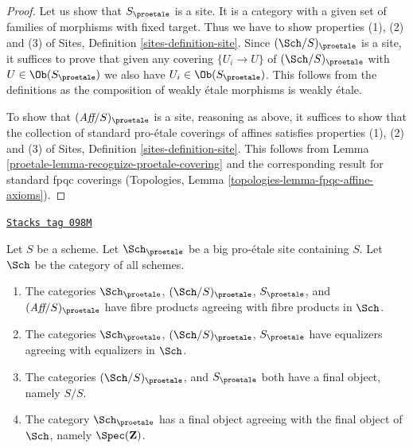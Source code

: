 \begin{proof}

Let us show that $S_\proetale$ is a site. It is a category with a
given set of families of morphisms with fixed target. Thus we
have to show properties (1), (2) and (3) of
Sites, Definition \ref{sites-definition-site}.
Since $(\Sch/S)_\proetale$ is a site, it suffices to prove
that given any covering $\{U_i \to U\}$ of $(\Sch/S)_\proetale$
with $U \in \Ob(S_\proetale)$ we also have $U_i \in \Ob(S_\proetale)$.
This follows from the definitions
as the composition of weakly \'etale morphisms is weakly \'etale.

\medskip\noindent
To show that $(\textit{Aff}/S)_\proetale$ is a site, reasoning as above,
it suffices to show that the collection of standard pro-\'etale coverings
of affines satisfies properties (1), (2) and (3) of
Sites, Definition \ref{sites-definition-site}.
This follows from Lemma \ref{proetale-lemma-recognize-proetale-covering}
and the corresponding result for standard fpqc coverings
(Topologies, Lemma \ref{topologies-lemma-fpqc-affine-axioms}).
\end{proof}

\begin{lemma}
\label{proetale-lemma-fibre-products-proetale}
\href{https://stacks.math.columbia.edu/tag/098M}{\texttt{Stacks tag 098M}}

Let $S$ be a scheme. Let $\Sch_\proetale$ be a big pro-\'etale
site containing $S$. Let $\Sch$ be the category of all schemes.
\begin{enumerate}
\item The categories $\Sch_\proetale$, $(\Sch/S)_\proetale$,
$S_\proetale$, and $(\textit{Aff}/S)_\proetale$ have fibre products
agreeing with fibre products in $\Sch$.
\item The categories $\Sch_\proetale$, $(\Sch/S)_\proetale$,
$S_\proetale$ have equalizers agreeing with equalizers in $\Sch$.
\item The categories $(\Sch/S)_\proetale$, and $S_\proetale$ both have
a final object, namely $S/S$.
\item The category $\Sch_\proetale$ has a final object agreeing
with the final object of $\Sch$, namely $\Spec(\mathbf{Z})$.
\end{enumerate}
\end{lemma}

